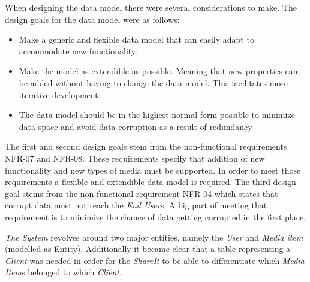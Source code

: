 \documentclass[../report.tex]{subfiles}
\begin{document}
\graphicspath{{img/}{../img/}}

When designing the data model there were several considerations to make. The design goals for the data model were as follows:
\begin{itemize}
\item Make a generic and flexible data model that can easily adapt to accommodate new functionality. 
\item Make the model as extendible as possible. Meaning that new properties can be added without having to change the data model. This facilitates more iterative development.
\item The data model should be in the highest normal form possible to minimize data space and avoid data corruption as a result of redundancy

\end{itemize} 

The first and second design goals stem from the non-functional requirements NFR-07 and NFR-08. These requirements specify that addition of new functionality and new types of media must be supported. In order to meet those requirements a flexible and extendible data model is required.
The third design goal stems from the non-functional requirement NFR-04 which states that corrupt data must not reach the \textit{End User}s. A big part of meeting that requirement is to minimize the chance of data getting corrupted in the first place.





\textit{The System} revolves around two major entities, namely the \textit{User} and \textit{Media item} (modelled as Entity). Additionally it became clear that a table representing a \textit{Client} was needed in order for the \textit{ShareIt} to be able to differentiate which \textit{Media Item}s belonged to which \textit{Client}. \\
\end{document}
